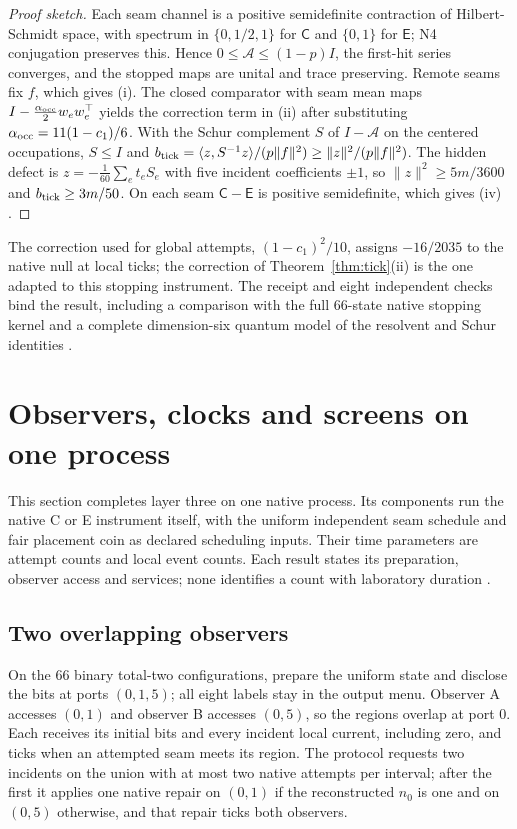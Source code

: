 \documentclass[11pt]{article}
\theoremstyle{definition}
\theoremstyle{remark}
\theoremstyle{plain}
\newcommand{\Cn}{\mathsf{C}}
\newcommand{\En}{\mathsf{E}}
\begin{document}
\begin{proof}[Proof sketch]
Each seam channel is a positive semidefinite contraction of Hilbert-Schmidt
space, with spectrum in $\{0,1/2,1\}$ for $\Cn$ and $\{0,1\}$ for $\En$; N4
conjugation preserves this. Hence $0\le\mathcal A\le(1-p)I$, the first-hit
series converges, and the stopped maps are unital and trace preserving.
Remote seams fix $f$, which gives (i). The closed comparator with seam mean
maps $I-\frac{\alpha_{\rm occ}}2w_ew_e^{\top}$ yields the correction term
in (ii) after substituting $\alpha_{\rm occ}=11(1-c_1)/6$. With the Schur complement $S$ of
$I-\mathcal A$ on the centered occupations, $S\le I$ and
$b_{\rm tick}=\langle z,S^{-1}z\rangle/(p\lVert f\rVert^2)\ge
\lVert z\rVert^2/(p\lVert f\rVert^2)$. The hidden defect is
$z=-\frac1{60}\sum_et_eS_e$ with five incident coefficients $\pm1$, so
$\lVert z\rVert^2\ge5m/3600$ and $b_{\rm tick}\ge3m/50$. On each seam
$\Cn-\En$ is positive semidefinite, which gives (iv) \cite{ltREADME}.
\end{proof}

The correction used for global attempts, $(1-c_1)^2/10$, assigns $-16/2035$
to the native null at local ticks; the correction of
Theorem~\ref{thm:tick}(ii) is the one adapted to this stopping instrument.
The receipt and eight independent checks bind the result, including a
comparison with the full 66-state native stopping kernel and a complete
dimension-six quantum model of the resolvent and Schur identities
\cite{ltREADME,rLT}.

\section{Observers, clocks and screens on one process}
\label{sec:native-process}

This section completes layer three on one native process. Its components
run the native C or E instrument itself, with the uniform independent seam
schedule and fair placement coin as declared scheduling inputs. Their time parameters are attempt counts and
local event counts. Each result states its preparation, observer access
and services; none identifies a count with laboratory duration
\cite{nativeRecovery}.

\subsection{Two overlapping observers}
\label{sec:correspondence}

On the $66$ binary total-two configurations, prepare the uniform state and
disclose the bits at ports $(0,1,5)$; all eight labels stay in the output
menu. Observer A accesses $(0,1)$ and observer B accesses $(0,5)$, so the
regions overlap at port $0$. Each receives its initial bits and every
incident local current, including zero, and ticks when an attempted seam
meets its region. The protocol requests two incidents on the union with at
most two native attempts per interval; after the first it applies one
native repair on $(0,1)$ if the reconstructed $n_0$ is one and on $(0,5)$
otherwise, and that repair ticks both observers.
\end{document}
